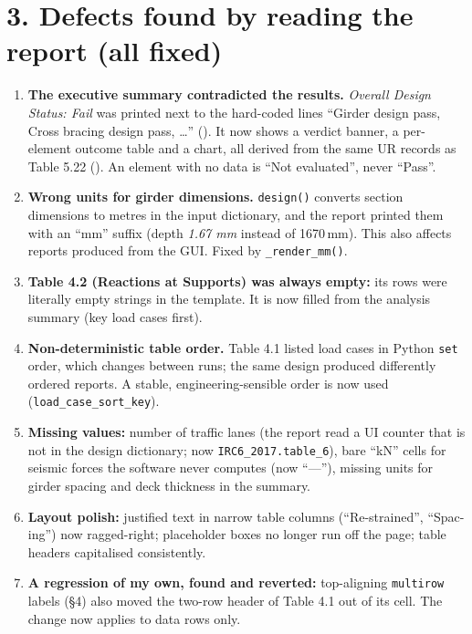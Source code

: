 \documentclass[11pt,a4paper]{article}
\newcommand{\file}[1]{\texttt{\detokenize{#1}}}
\begin{document}
\section*{3. Defects found by reading the report (all fixed)}
\begin{enumerate}
\item \textbf{The executive summary contradicted the results.} \emph{Overall Design Status: Fail} was printed
next to the hard-coded lines ``Girder design pass, Cross bracing design pass, \dots'' (\file{executive_summary.py}).
It now shows a verdict banner, a per-element outcome table and a chart, all derived from the same UR records
as Table 5.22 (\file{verdict.py}). An element with no data is ``Not evaluated'', never ``Pass''.
\item \textbf{Wrong units for girder dimensions.} \texttt{design()} converts section dimensions to metres in
the input dictionary, and the report printed them with an ``mm'' suffix (depth \emph{1.67 mm} instead of
1670\,mm). This also affects reports produced from the GUI. Fixed by \verb|_render_mm()|.
\item \textbf{Table 4.2 (Reactions at Supports) was always empty:} its rows were literally empty strings in the
template. It is now filled from the analysis summary (key load cases first).
\item \textbf{Non-deterministic table order.} Table 4.1 listed load cases in Python \texttt{set} order, which
changes between runs; the same design produced differently ordered reports. A stable, engineering-sensible
order is now used (\verb|load_case_sort_key|).
\item \textbf{Missing values:} number of traffic lanes (the report read a UI counter that is not in the design
dictionary; now \verb|IRC6_2017.table_6|), bare ``kN'' cells for seismic forces the software never computes
(now ``---''), missing units for girder spacing and deck thickness in the summary.
\item \textbf{Layout polish:} justified text in narrow table columns (``Re-strained'', ``Spac- ing'') now
ragged-right; placeholder boxes no longer run off the page; table headers capitalised consistently.
\item \textbf{A regression of my own, found and reverted:} top-aligning \texttt{multirow} labels
(\S4) also moved the two-row header of Table 4.1 out of its cell. The change now applies to data rows only.
\end{enumerate}
\end{document}
